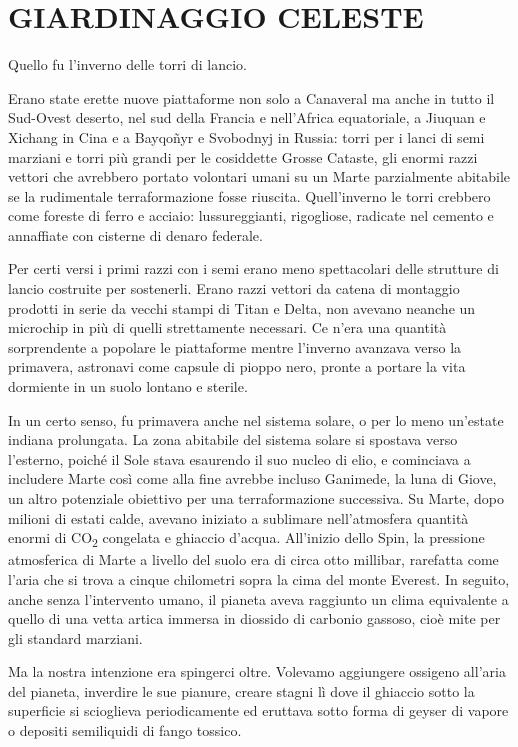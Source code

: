 \chapter{GIARDINAGGIO CELESTE}\label{giardinaggio-celeste}

\hfill\break

Quello fu l'inverno delle torri di lancio.

Erano state erette nuove piattaforme non solo a Canaveral ma anche in
tutto il Sud-Ovest deserto, nel sud della Francia e nell'Africa
equatoriale, a Jiuquan e Xichang in Cina e a Bayqoñyr e Svobodnyj in
Russia: torri per i lanci di semi marziani e torri più grandi per le
cosiddette Grosse Cataste, gli enormi razzi vettori che avrebbero
portato volontari umani su un Marte parzialmente abitabile se la
rudimentale terraformazione fosse riuscita. Quell'inverno le torri
crebbero come foreste di ferro e acciaio: lussureggianti, rigogliose,
radicate nel cemento e annaffiate con cisterne di denaro federale.

Per certi versi i primi razzi con i semi erano meno spettacolari delle
strutture di lancio costruite per sostenerli. Erano razzi vettori da
catena di montaggio prodotti in serie da vecchi stampi di Titan e Delta,
non avevano neanche un microchip in più di quelli strettamente
necessari. Ce n'era una quantità sorprendente a popolare le piattaforme
mentre l'inverno avanzava verso la primavera, astronavi come capsule di
pioppo nero, pronte a portare la vita dormiente in un suolo lontano e
sterile.

In un certo senso, fu primavera anche nel sistema solare, o per lo meno
un'estate indiana prolungata. La zona abitabile del sistema solare si
spostava verso l'esterno, poiché il Sole stava esaurendo il suo nucleo
di elio, e cominciava a includere Marte così come alla fine avrebbe
incluso Ganimede, la luna di Giove, un altro potenziale obiettivo per
una terraformazione successiva. Su Marte, dopo milioni di estati calde,
avevano iniziato a sublimare nell'atmosfera quantità enormi di
CO\textsubscript{2} congelata e ghiaccio d'acqua. All'inizio dello Spin,
la pressione atmosferica di Marte a livello del suolo era di circa otto
millibar, rarefatta come l'aria che si trova a cinque chilometri sopra
la cima del monte Everest. In seguito, anche senza l'intervento umano,
il pianeta aveva raggiunto un clima equivalente a quello di una vetta
artica immersa in diossido di carbonio gassoso, cioè mite per gli
standard marziani.

Ma la nostra intenzione era spingerci oltre. Volevamo aggiungere
ossigeno all'aria del pianeta, inverdire le sue pianure, creare stagni
lì dove il ghiaccio sotto la superficie si scioglieva periodicamente ed
eruttava sotto forma di geyser di vapore o depositi semiliquidi di fango
tossico.

